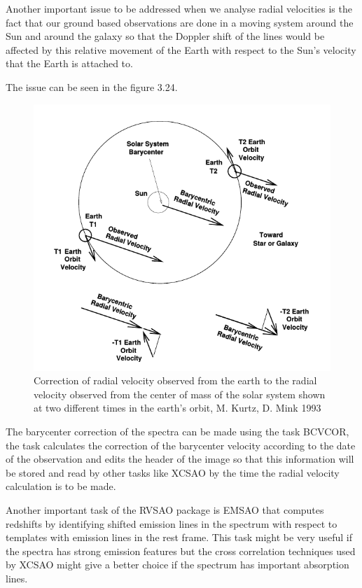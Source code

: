 Another important issue to be addressed when we analyse radial velocities is the fact that our ground based observations are done in a moving system around the Sun and around the galaxy so that the Doppler shift of the lines would be affected by this relative movement of the Earth with respect to the Sun's velocity that the Earth is attached to. 

The issue can be seen in the figure 3.24.

\begin{figure}[]
\centering
\includegraphics[width=12cm]{images/bcvcor.png}
\caption[The nature of the barycenter shift of radial velocities]{Correction of radial velocity observed from the earth to the radial velocity observed from the center of mass of the solar system shown at two different times in the earth's orbit, M. Kurtz, D. Mink 1993 \cite{1}}
\end{figure}

The barycenter correction of the spectra can be made using the task BCVCOR, the task calculates the correction of the barycenter velocity according to the date of the observation and edits the header of the image so that this information will be stored and read by other tasks like XCSAO by the time the radial velocity calculation is to be made. 

Another important task of the RVSAO package is EMSAO that computes redshifts by identifying shifted emission lines in the spectrum with respect to templates with emission lines in the rest frame. This task might be very useful if the spectra has strong emission features but the cross correlation techniques used by XCSAO might give a better choice if the spectrum has important absorption lines.

